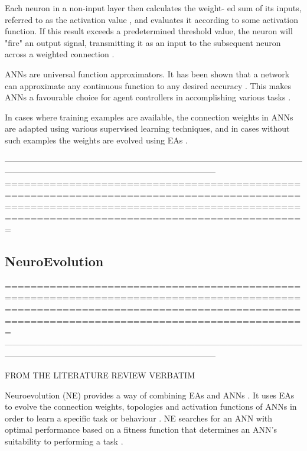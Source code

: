 \documentclass[conference]{IEEEtran}
\begin{document}
Each neuron in a non-input layer then calculates the weight- ed sum of its inputs, referred to as the activation value \cite{yegnanarayana2009artificial,RefWorks:31}, and evaluates it according to some activation function. If this result exceeds a predetermined threshold value, the neuron will "fire" an output signal, transmitting it as an input to the subsequent neuron across a weighted connection \cite{yegnanarayana2009artificial}.

ANNs are universal function approximators. It has been shown that a network can approximate any continuous function to any desired accuracy \cite{zhang1998forecasting}. This makes ANNs a favourable choice for agent controllers in accomplishing various tasks \cite{yegnanarayana2009artificial}.

In cases where training examples are available, the connection weights in ANNs are adapted using various supervised learning techniques, and in cases without such examples the weights are evolved using EAs \cite{dayhoff2001artificial,RefWorks:1}.

-----------------------------------------------------------------------------------------------------------------------------------------------------------------------------------------
=========================================================================================================================================================================================




\subsection{NeuroEvolution}

=========================================================================================================================================================================================
-----------------------------------------------------------------------------------------------------------------------------------------------------------------------------------------

FROM THE LITERATURE REVIEW VERBATIM


Neuroevolution (NE) provides a way of combining EAs and ANNs \cite{RefWorks:31}. It uses EAs to evolve the connection weights, topologies and activation functions of ANNs in order to learn a specific task or behaviour \cite{gomez1999solving}. NE searches for an ANN with optimal performance based on a fitness function that determines an ANN's suitability to performing a task \cite{RefWorks:31}.
\end{document}
